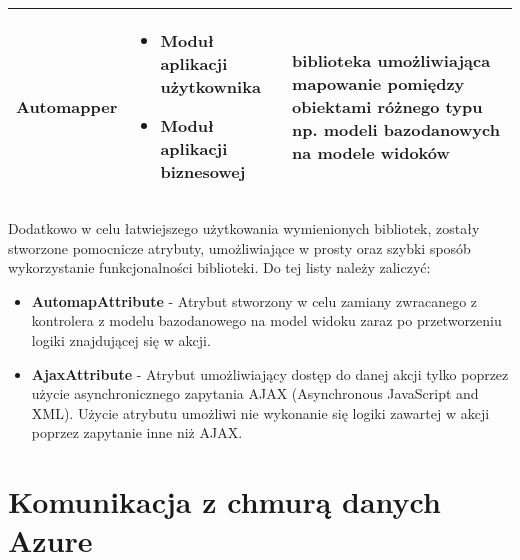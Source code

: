 \begin{center}
\begin{tabular}{ | l | p{6.5cm} | p{5cm} |}
        \hline Automapper &  
    	\begin{itemize} 
   			 \item Moduł aplikacji użytkownika 
   			 \item Moduł aplikacji biznesowej	
   		\end{itemize} 
    & biblioteka umożliwiająca mapowanie pomiędzy obiektami różnego typu  np. modeli bazodanowych na modele widoków  		\\ \hline
    
    
	\end{tabular}
\end{center}



Dodatkowo w celu łatwiejszego użytkowania wymienionych bibliotek, zostały stworzone pomocnicze atrybuty, umożliwiające w prosty oraz szybki sposób wykorzystanie funkcjonalności biblioteki. Do tej listy należy zaliczyć:
\begin{itemize}
  \item \textbf{AutomapAttribute} - Atrybut stworzony w celu zamiany zwracanego z kontrolera z modelu bazodanowego na model widoku zaraz po przetworzeniu logiki znajdującej się w akcji.
  \item \textbf{AjaxAttribute} - Atrybut umożliwiający dostęp do danej akcji tylko poprzez użycie asynchronicznego zapytania AJAX (Asynchronous JavaScript and XML). Użycie atrybutu umożliwi nie wykonanie się logiki zawartej w akcji poprzez zapytanie inne niż AJAX.
\end{itemize}


\section{Komunikacja z chmurą danych Azure}